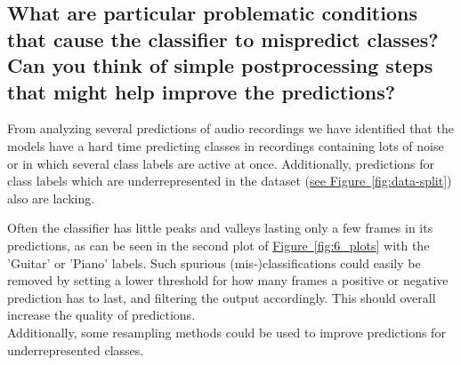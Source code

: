 \subsection{What are particular problematic conditions that cause the classifier to mispredict classes? Can you think of simple postprocessing steps that might help improve the predictions?}
\label{sec:Analysing Predictions:c}

From analyzing several predictions of audio recordings we have identified that the models have a hard time predicting classes in recordings containing lots of noise or in which several class labels are active at once. Additionally, predictions for class labels which are underrepresented in the dataset (\hyperref[fig:data-split]{see Figure~\ref*{fig:data-split}}) also are lacking. 

Often the classifier has little peaks and valleys lasting only a few frames in its predictions, as can be seen in the second plot of \hyperref[fig:6_plots]{Figure~\ref*{fig:6_plots}} with the 'Guitar' or 'Piano' labels. Such spurious (mis-)classifications could easily be removed by setting a lower threshold for how many frames a positive or negative prediction has to last, and filtering the output accordingly. This should overall increase the quality of predictions.\\
Additionally, some resampling methods could be used to improve predictions for underrepresented classes.






